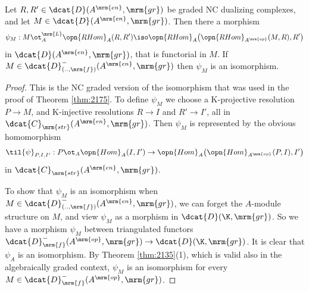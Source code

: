 \begin{lem} \label{lem:3917}
Let $R, R' \in \dcat{D}(A^{\mrm{en}}, \mrm{gr})$ 
be graded NC dualizing complexes, and let 
$M \in \dcat{D}_{}(A^{\mrm{en}},  \mrm{gr})$.
Then there a morphism 
\[ \psi_M : M \ot^{\mrm{L}}_{A} \opn{RHom}_A(R, R') \iso 
\opn{RHom}_A \bigl( \opn{RHom}_{A^{\mrm{op}}}(M, R), R' \bigr) \]
in $\dcat{D}(A^{\mrm{en}}, \mrm{gr})$, that is functorial in $M$. 
If $M \in \dcat{D}^-_{(.., \mrm{f})}(A^{\mrm{en}},  \mrm{gr})$
then $\psi_M$ is an isomorphism. 
\end{lem}

\begin{proof}
This is the NC graded version of the isomorphism that was used in the proof of 
Theorem \ref{thm:2175}. To define $\psi_M$ we choose a K-projective 
resolution $P \to M$, and K-injective resolutions 
$R \to I$ and $R' \to I'$, all in 
$\dcat{C}_{\mrm{str}}(A^{\mrm{en}}, \mrm{gr})$.
Then $\psi_M$ is represented by the obvious homomorphism 
\[ \til{\psi}_{P, I, I'} : P \ot_{A} \opn{Hom}_A(I, I') \to 
\opn{Hom}_A \bigl( \opn{Hom}_{A^{\mrm{op}}}(P, I), I' \bigr) \]
in $\dcat{C}_{\mrm{str}}(A^{\mrm{en}}, \mrm{gr})$.

To show that $\psi_M$ is an isomorphism when 
$M \in \dcat{D}^-_{(.., \mrm{f})}(A^{\mrm{en}},  \mrm{gr})$,
we can forget the $A$-module structure on $M$, and view $\psi_M$ as a morphism 
in $\dcat{D}(\K, \mrm{gr})$. So we have a morphism $\psi_M$ between 
triangulated functors 
$\dcat{D}^-_{\mrm{f}}(A^{\mrm{op}}, \mrm{gr}) \to \dcat{D}(\K, \mrm{gr})$.
It is clear that $\psi_A$ is an isomorphism. 
By Theorem \ref{thm:2135}(1), 
which is valid also in the algebraically graded 
context, $\psi_M$ is an isomorphism for every 
$M \in \dcat{D}^-_{\mrm{f}}(A^{\mrm{op}}, \mrm{gr})$. 
\end{proof}

